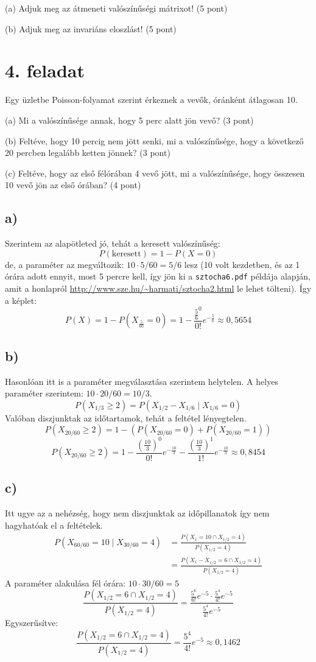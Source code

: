 \documentclass[a4paper,12pt]{article}   		%
\begin{document}
(a) Adjuk meg az átmeneti valószínűségi mátrixot! (5 pont)

(b) Adjuk meg az invariáns eloszlást! (5 pont)

\pagebreak
\section*{4. feladat}
Egy üzletbe Poisson-folyamat szerint érkeznek a vevők, óránként 
átlagosan 10.

(a) Mi a valószínűsége annak, hogy 5 perc alatt jön vevő? (3 pont)

(b) Feltéve, hogy 10 percig nem jött senki, mi a valószínűsége, hogy a
következő 20 percben legalább ketten jönnek? (3 pont)

(c) Feltéve, hogy az első félórában 4 vevő jött, mi a valószínűsége, 
hogy összesen 10 vevő jön az első órában? (4 pont)

\subsection*{a)}
Szerintem az alapötleted jó, tehát a keresett valószínűség:
\[P(\text{keresett}) = 1 - P(X = 0)\]
de, a paraméter az megváltozik: $10 \cdot 5/60 = 5/6$ lesz (10 volt kezdetben, 
és az 1 órára adott ennyit, most 5 percre kell, így jön ki a
\texttt{sztocha6.pdf} példája alapján, amit a honlapról 
\url{http://www.sze.hu/~harmati/sztocha2.html} le lehet tölteni). 
Így a képlet:
\[P(X) = 1 - P(X_\frac{5}{60} = 0) = 1 - \frac{\frac{5}{6}^0}{0!}
e^{-\frac{5}{6}} \approx 0,5654\]

\subsection*{b)}
Hasonlóan itt is a paraméter megválasztása szerintem helytelen. A helyes 
paraméter szerintem: $10 \cdot 20/60 = 10/3$.
\[P(X_{1/3} \geq 2) = P(X_{1/2}-X_{1/6} \mid X_{1/6}=0)\]
Valóban diszjunktak az időtartamok, tehát a feltétel lényegtelen.
\[
P(X_{20/60} \geq 2) = 1 - \left( P(X_{20/60} = 0)+P(X_{20/60} = 1)\right)
\]
\[
P(X_{20/60} \geq 2) = 1 - \frac{\left(\frac{10}{3}\right)^0}{0!}e^
{-\frac{10}{3}} - \frac{\left(\frac{10}{3}\right)^1}{1!}e^{-\frac{10}{3}} 
\approx 0,8454
\]

\subsection*{c)}
Itt ugye az a nehézség, hogy nem diszjunktak az időpillanatok így nem
hagyhatóak el a feltételek.
\begin{equation*}
\begin{split}
P(X_{60/60} = 10 \mid X_{30/60} = 4) &= \frac{P(X_1 = 10 \cap X_{1/2} = 4)}
{P(X_{1/2} = 4)} \\
&= \frac{P(X_1-X_{1/2} = 6 \cap X_{1/2} = 4)}{P(X_{1/2} = 4)}
\end{split}
\end{equation*}
A paraméter alakulása fél órára: $10 \cdot 30/60 = 5$
\[
\frac{P(X_{1/2} = 6 \cap X_{1/2} = 4)}{P(X_{1/2} = 4)} = \frac{\frac{5^6}{6!}
e^{-5} \cdot \frac{5^4}{4!} e^{-5}}{\frac{5^4}{4!} e^{-5}}
\]
Egyszerűsítve:
\[
\frac{P(X_{1/2} = 6 \cap X_{1/2} = 4)}{P(X_{1/2} = 4)} = 
\frac{5^4}{4!} e^{-5} \approx 0,1462
\]
\end{document}
